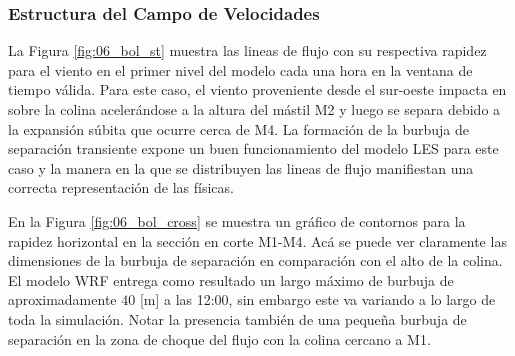 \subsubsection{Estructura del Campo de Velocidades}
La Figura \ref{fig:06_bol_st} muestra las lineas de flujo con su respectiva rapidez para el viento en el primer nivel del modelo cada una hora en la ventana de tiempo válida. Para este caso, el viento proveniente desde el sur-oeste impacta en sobre la colina acelerándose a la altura del mástil M2 y luego se separa debido a la expansión súbita que ocurre cerca de M4. La formación de la burbuja de separación transiente expone un buen funcionamiento del modelo LES para este caso y la manera en la que se distribuyen las lineas de flujo manifiestan una correcta representación de las físicas.

En la Figura \ref{fig:06_bol_cross} se muestra un gráfico de contornos para la rapidez horizontal en la sección en corte M1-M4. Acá se puede ver claramente las dimensiones de la burbuja de separación en comparación con el alto de la colina. El modelo WRF entrega como resultado un largo máximo de burbuja de aproximadamente $40$ [m] a las 12:00, sin embargo este va variando a lo largo de toda la simulación. Notar la presencia también de una pequeña burbuja de separación en la zona de choque del flujo con la colina cercano a M1.

